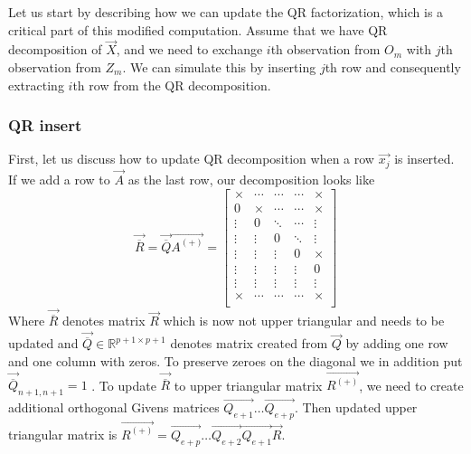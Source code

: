 Let us start by describing how we can update the QR factorization, which is a critical part of this modified computation. Assume that we have QR decomposition of $\vec{X}$, and we need to exchange $i$th observation from $O_m$ with $j$th observation from $Z_m$. We can simulate this by inserting $j$th row and consequently extracting $i$th row from the QR decomposition. 



\subsubsection*{QR insert} 
First, let us discuss how to update QR decomposition when a row $\vec{x_j}$ is inserted. 
If we add a row to $\vec{A}$ as the last row, our decomposition looks like
\begin{equation}
    \vec{\overline{R}} =  \vec{\overline{Q}} \vec{A^{(+)}}  = 
    \begin{bmatrix}
        \times & \cdots & \cdots & \cdots & \times \\
        0 &\times & \cdots & \cdots & \times \\
        \vdots& 0&\ddots & \cdots & \vdots \\
        \vdots& \vdots&0 & \ddots &  \vdots \\
        \vdots& \vdots& \vdots& 0& \times \\
        \vdots& \vdots& \vdots& \vdots& 0  \\
        \vdots& \vdots& \vdots& \vdots& \vdots \\
        \times & \cdots & \cdots & \cdots & \times \\
    \end{bmatrix}
\end{equation}
Where $\vec{\overline{R}}$ denotes matrix $\vec{R}$ which is now not upper triangular and needs to be updated and $\vec{\overline{Q}} \in \mathbb{R}^{p+1 \times p+1}$ denotes matrix created from $\vec{Q}$ by adding one row and one column with zeros. To preserve zeroes on the diagonal we in addition put $\vec{\overline{Q}}_{n+1,n+1} = 1$ . 
To update $\vec{\overline{R}}$ to upper triangular matrix $\vec{R^{(+)}}$, we need to create additional orthogonal Givens matrices $\vec{Q_{e+1}}\ldots\vec{Q_{e+p}}$. Then updated upper triangular matrix is
$\vec{R^{(+)}}  =  \vec{Q_{e+p}} \ldots \vec{Q_{e+2}} \vec{Q_{e+1}} \vec{R}$. 

